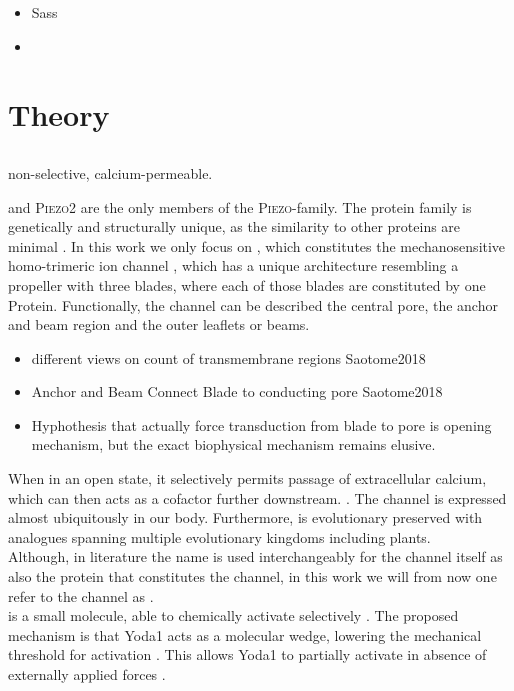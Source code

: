 \begin{itemize}
	\item Sass
	\item 
\end{itemize}


\section{Theory}

\subsection{\Piezo{}}


non-selective, calcium-permeable.

\Piezo{} and \textsc{Piezo2} are the only members of the \textsc{Piezo}-family. The protein family is genetically and structurally unique, as the similarity to other proteins are minimal \cite{Coste2010}. In this work we only focus on \Piezo{}, which constitutes the mechanosensitive homo-trimeric ion channel \Piezo{}, which has a unique architecture resembling a propeller with three blades, where each of those blades are constituted by one \Piezo{} Protein. Functionally, the channel can be described the central pore, the anchor and beam region and the outer leaflets or beams. 

\begin{itemize}
	\item different views on count of transmembrane regions Saotome2018
	\item Anchor and Beam Connect Blade to conducting pore Saotome2018
	\item Hyphothesis that actually force transduction from blade to pore is opening mechanism, but the exact biophysical mechanism remains elusive. 
\end{itemize}

 When in an open state, it selectively permits passage of extracellular calcium, which can then acts as a cofactor further downstream. \cite{Coste2010}. The channel is expressed almost ubiquitously in our body. Furthermore, \Piezo{} is evolutionary preserved with analogues spanning multiple evolutionary kingdoms including plants. \cite{Coste2010}\\
Although, in literature the name \Piezo{} is used interchangeably for the channel itself as also the protein that constitutes the channel, in this work we will from now one refer to the channel as \Piezo{}.\\
\Yoda{} is a small molecule, able to chemically activate \Piezo{} selectively \cite{Syeda2015}. The proposed mechanism is that Yoda1 acts as a molecular wedge, lowering the mechanical threshold for activation \cite{Botello-Smith2019}. This allows Yoda1 to partially activate \Piezo{} in absence of externally applied forces \cite{Lacroix2018}.

